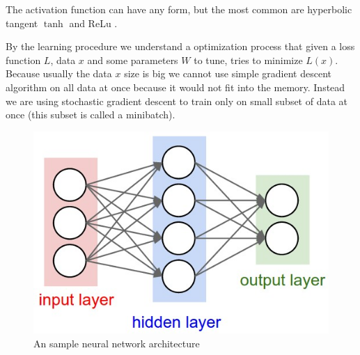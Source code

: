The activation function can have any form, but the most common are hyperbolic tangent
$\tanh$ and ReLu \cite{nair_rectified_2010}.

By the learning procedure we understand a optimization process that given a
loss function $L$, data $x$ and some parameters $W$ to tune, tries to minimize $L(x)$.
Because usually the data $x$ size is big we cannot use simple gradient descent
algorithm on all data at once because it would not fit into the memory. Instead
we are using stochastic gradient descent to train only on small subset of data
at once (this subset is called a minibatch).

\begin{figure}[!htbp]
  \centering
  \includegraphics[width=0.6\linewidth]{img/nn/neural_net.jpeg}
  \caption{An sample neural network architecture} 
  \label{fig:sample_nn}
\end{figure}

